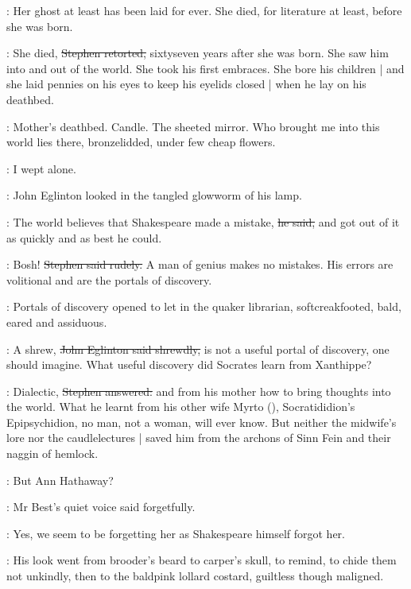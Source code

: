 \eglinton:
Her ghost at least has been laid for ever.
She died,
for literature at least,
before she was born.

\Stephen:
She died,
\sout{Stephen retorted,}
sixtyseven years after she was born.
She saw him into and out of the world.
She took his first embraces.
She bore his children |
and she laid pennies on his eyes to keep his eyelids closed |
when he lay
on his deathbed.

\StephenInt:
Mother's deathbed.
Candle.
The sheeted mirror.
Who brought me into this world lies there,
bronzelidded,
under few cheap flowers.

\StephenInt:
I wept alone.

:
John Eglinton looked in the tangled glowworm of his lamp.

\eglinton:
The world believes that Shakespeare made a mistake,
\sout{he said,}
and got out of it as quickly and as best he could.

\Stephen:
Bosh!
\sout{Stephen said rudely.}
A man of genius makes no mistakes.
His errors are volitional and are the portals of discovery.

:
Portals of discovery opened
to let in the quaker librarian,
softcreakfooted, bald, eared and assiduous.

\eglinton:
A shrew,
\sout{John Eglinton said shrewdly,}
is not a useful portal of discovery,
one should imagine.
What useful discovery did Socrates learn from Xanthippe?

\Stephen:
Dialectic,
\sout{Stephen answered:}
and from his mother how to bring thoughts into the world.
What he learnt from his other wife Myrto (),
Socratididion's Epipsychidion,
no man, not a woman, will ever know.
But neither the midwife's lore nor the caudlelectures |
saved him from the archons of Sinn Fein and their naggin of hemlock.

\best:
But Ann Hathaway?

:
Mr Best's quiet voice said forgetfully.

\best:
Yes,
we seem to be forgetting her as Shakespeare himself forgot her.

:
His look went from brooder's beard to carper's skull,
to remind,
to chide them not unkindly,
then to the baldpink lollard costard,
guiltless though maligned.

